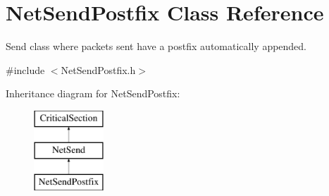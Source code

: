 \hypertarget{class_net_send_postfix}{
\section{NetSendPostfix Class Reference}
\label{class_net_send_postfix}
}


Send class where packets sent have a postfix automatically appended.  




{\ttfamily \#include $<$NetSendPostfix.h$>$}

Inheritance diagram for NetSendPostfix:\begin{figure}[H]
\begin{center}
\leavevmode
\includegraphics[height=3.000000cm]{class_net_send_postfix}
\end{center}
\end{figure}
